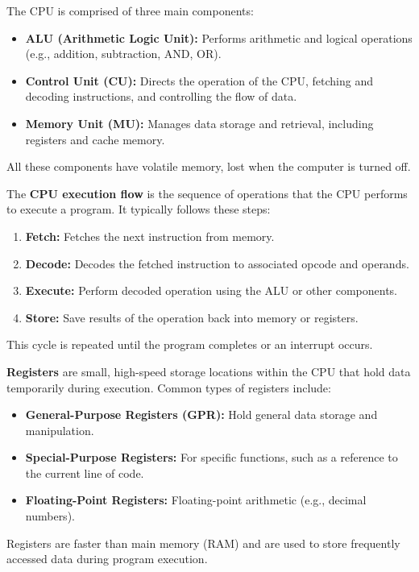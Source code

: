 \newpage
\begin{Def}

    The CPU is comprised of three main components:
    \begin{itemize}
        \item \textbf{ALU (Arithmetic Logic Unit):} Performs arithmetic and logical operations (e.g., addition, subtraction, AND, OR).
        \item \textbf{Control Unit (CU):} Directs the operation of the CPU, fetching and decoding instructions, and controlling the flow of data.
        \item \textbf{Memory Unit (MU):} Manages data storage and retrieval, including registers and cache memory.
    \end{itemize}
    \noindent
    All these components have volatile memory, lost when the computer is turned off.
\end{Def}

\begin{Def}
    
    \label{def:cpu_execution_flow}

    The \textbf{CPU execution flow} is the sequence of operations that the CPU performs to execute a program. 
    It typically follows these steps:
    \begin{enumerate}
        \item \textbf{Fetch:} Fetches the next instruction from memory.
        \item \textbf{Decode:} Decodes the fetched instruction to associated opcode and operands.
        \item \textbf{Execute:} Perform decoded operation using the ALU or other components.
        \item \textbf{Store:} Save results of the operation back into memory or registers.
    \end{enumerate}
    \noindent
    This cycle is repeated until the program completes or an interrupt occurs.
\end{Def}

\begin{Def}[Registers]

    \label{def:registers}

    \textbf{Registers} are small, high-speed storage locations within the CPU that hold data temporarily during execution. 
    Common types of registers include:
    \begin{itemize}
        \item \textbf{General-Purpose Registers (GPR):} Hold general data storage and manipulation.
        \item \textbf{Special-Purpose Registers:} For specific functions, such as a reference to the current line of code.
        \item \textbf{Floating-Point Registers:} Floating-point arithmetic (e.g., decimal numbers).
    \end{itemize}
    \noindent
    Registers are faster than main memory (RAM) and are used to store frequently accessed data during program execution.
\end{Def}

